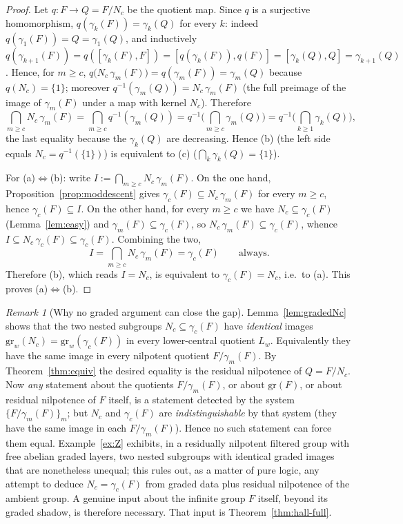 \documentclass{amsart}
\theoremstyle{definition}
\theoremstyle{remark}
\newtheorem{remark}{Remark}
\begin{document}
\begin{proof}
Let $q\colon F\to Q=F/N_c$ be the quotient map. Since $q$ is a surjective
homomorphism, $q(\gamma_k(F))=\gamma_k(Q)$ for every $k$: indeed
$q(\gamma_1(F))=Q=\gamma_1(Q)$, and inductively
$q(\gamma_{k+1}(F))=q([\gamma_k(F),F])=[q(\gamma_k(F)),q(F)]=[\gamma_k(Q),Q]
=\gamma_{k+1}(Q)$. Hence, for $m\ge c$,
$q\big(N_c\,\gamma_m(F)\big)=q(\gamma_m(F))=\gamma_m(Q)$ because $q(N_c)=\{1\}$;
moreover $q^{-1}(\gamma_m(Q))=N_c\,\gamma_m(F)$ (the full preimage of the image of
$\gamma_m(F)$ under a map with kernel $N_c$). Therefore
\[
\bigcap_{m\ge c} N_c\,\gamma_m(F)=\bigcap_{m\ge c} q^{-1}(\gamma_m(Q))
=q^{-1}\!\Big(\bigcap_{m\ge c}\gamma_m(Q)\Big)
=q^{-1}\!\Big(\bigcap_{k\ge1}\gamma_k(Q)\Big),
\]
the last equality because the $\gamma_k(Q)$ are decreasing. Hence (b) (the
left side equals $N_c=q^{-1}(\{1\})$) is equivalent to (c)
($\bigcap_k\gamma_k(Q)=\{1\}$).

For (a)$\Leftrightarrow$(b): write $I:=\bigcap_{m\ge c}N_c\,\gamma_m(F)$. On the
one hand, Proposition~\ref{prop:moddescent} gives
$\gamma_c(F)\subseteq N_c\,\gamma_m(F)$ for every $m\ge c$, hence
$\gamma_c(F)\subseteq I$. On the other hand, for every $m\ge c$ we have
$N_c\subseteq\gamma_c(F)$ (Lemma~\ref{lem:easy}) and
$\gamma_m(F)\subseteq\gamma_c(F)$, so $N_c\,\gamma_m(F)\subseteq\gamma_c(F)$,
whence $I\subseteq N_c\,\gamma_c(F)\subseteq\gamma_c(F)$. Combining the two,
\[
I=\bigcap_{m\ge c}N_c\,\gamma_m(F)=\gamma_c(F)\qquad\text{always.}
\]
Therefore (b), which reads $I=N_c$, is equivalent to $\gamma_c(F)=N_c$, i.e.\ to
(a). This proves (a)$\Leftrightarrow$(b).
\end{proof}

\begin{remark}[Why no graded argument can close the gap]\label{rem:graded-insufficient}
Lemma~\ref{lem:gradedNc} shows that the two nested subgroups
$N_c\subseteq\gamma_c(F)$ have \emph{identical} images $\mathrm{gr}_w(N_c)=\mathrm{gr}_w(\gamma_c(F))$
in every lower-central quotient $L_w$. Equivalently they have the same image in
every nilpotent quotient $F/\gamma_m(F)$. By Theorem~\ref{thm:equiv} the desired
equality is the residual nilpotence of $Q=F/N_c$. Now \emph{any} statement about
the quotients $F/\gamma_m(F)$, or about $\mathrm{gr}(F)$, or about residual nilpotence of
$F$ itself, is a statement detected by the system $\{F/\gamma_m(F)\}_m$; but
$N_c$ and $\gamma_c(F)$ are \emph{indistinguishable} by that system (they have the
same image in each $F/\gamma_m(F)$). Hence no such statement can force them equal.
Example~\ref{ex:Z} exhibits, in a residually nilpotent filtered group with free
abelian graded layers, two nested subgroups with identical graded images that are
nonetheless unequal; this rules out, as a matter of pure logic, any attempt to
deduce $N_c=\gamma_c(F)$ from graded data plus residual nilpotence of the ambient
group. A genuine input about the infinite group $F$ itself, beyond its graded
shadow, is therefore necessary. That input is Theorem~\ref{thm:hall-full}.
\end{remark}
\end{document}
